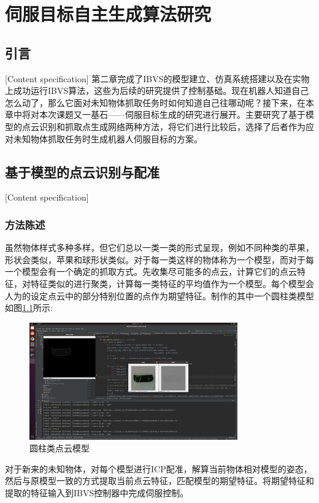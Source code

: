 \documentclass[fontset=fandol,type=bachelor,campus=harbin,bsmainpagenumberline=true]{hithesisbook}
\begin{document}
\chapter[伺服目标生成算法研究]{伺服目标自主生成算法研究}
\section{引言}[Content specification]
第二章完成了IBVS的模型建立、仿真系统搭建以及在实物上成功运行IBVS算法，这些为后续的研究提供了控制基础。现在机器人知道自己怎么动了，那么它面对未知物体抓取任务时如何知道自己往哪动呢？接下来，在本章中将对本次课题又一基石——伺服目标生成的研究进行展开。主要研究了基于模型的点云识别和抓取点生成网络两种方法，将它们进行比较后，选择了后者作为应对未知物体抓取任务时生成机器人伺服目标的方案。


\section{基于模型的点云识别与配准}[Content specification]
\subsection{方法陈述}
虽然物体样式多种多样，但它们总以一类一类的形式呈现，例如不同种类的苹果，形状会类似，苹果和球形状类似。对于每一类这样的物体称为一个模型，而对于每一个模型会有一个确定的抓取方式。先收集尽可能多的点云，计算它们的点云特征，对特征类似的进行聚类，计算每一类特征的平均值作为一个模型。每个模型会人为的设定点云中的部分特别位置的点作为期望特征。制作的其中一个圆柱类模型如图\ref{圆柱类点云模型}所示:
\begin{figure}[h]
\centering
\includegraphics[width = 0.8\textwidth]{chapter3/实时抓取点生成}
\caption{圆柱类点云模型}
\label{圆柱类点云模型}
\end{figure}


对于新来的未知物体，对每个模型进行ICP配准，解算当前物体相对模型的姿态，然后与原模型一致的方式提取当前点云特征，匹配模型的期望特征。将期望特征和提取的特征输入到IBVS控制器中完成伺服控制。
\end{document}
